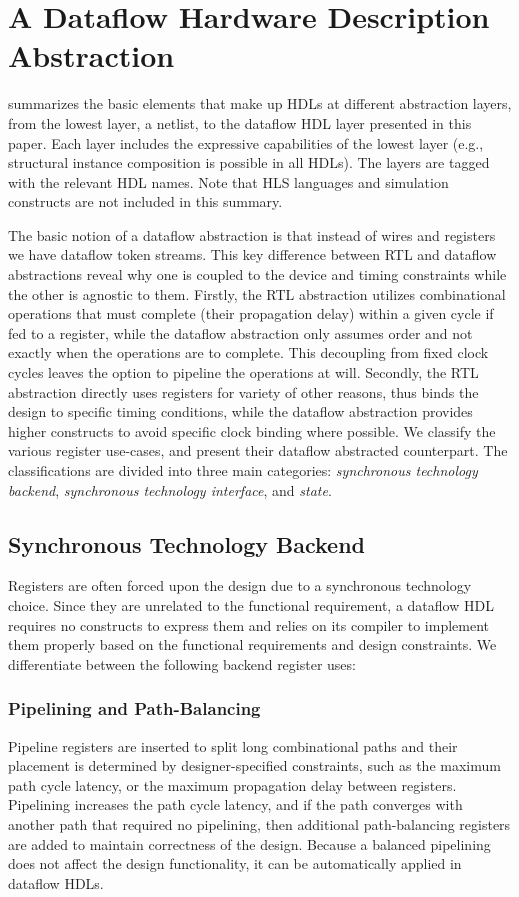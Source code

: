 \section{A Dataflow Hardware Description Abstraction}
\label{sec:motivation}
 summarizes the basic elements that make up HDLs at different abstraction layers, from the lowest layer, a netlist, to the dataflow HDL layer presented in this paper. Each layer includes the expressive capabilities of the lowest layer (e.g., structural instance composition is possible in all HDLs). The layers are tagged with the relevant HDL names. Note that HLS languages and simulation constructs are not included in this summary.

The basic notion of a dataflow abstraction is that instead of wires and registers we have dataflow token streams. This key difference between RTL and dataflow abstractions reveal why one is coupled to the device and timing constraints while the other is agnostic to them. Firstly, the RTL abstraction utilizes combinational operations that must complete (their propagation delay) within a given cycle if fed to a register, while the dataflow abstraction only assumes order and not exactly when the operations are to complete. This decoupling from fixed clock cycles leaves the option to pipeline the operations at will. Secondly, the RTL abstraction directly uses registers for variety of other reasons, thus binds the design to specific timing conditions, while the dataflow abstraction provides higher constructs to avoid specific clock binding where possible. We classify the various register use-cases, and present their dataflow abstracted counterpart. The classifications are divided into three main categories: \textit{synchronous technology backend}, \textit{synchronous technology interface}, and \textit{state}.

\subsection{Synchronous Technology Backend}
Registers are often forced upon the design due to a synchronous technology choice. Since they are unrelated to the functional requirement, a dataflow HDL requires no constructs to express them and relies on its compiler to implement them properly based on the functional requirements and design constraints. 
We differentiate between the following backend register uses:
\subsubsection{Pipelining and Path-Balancing}
Pipeline registers are inserted to split long combinational paths and their placement is determined by designer-specified constraints, such as the maximum path cycle latency, or the maximum propagation delay between registers. Pipelining increases the path cycle latency, and if the path converges with another path that required no pipelining, then additional path-balancing registers are added to maintain correctness of the design. Because a balanced pipelining does not affect the design functionality, it can be automatically applied in dataflow HDLs.   
